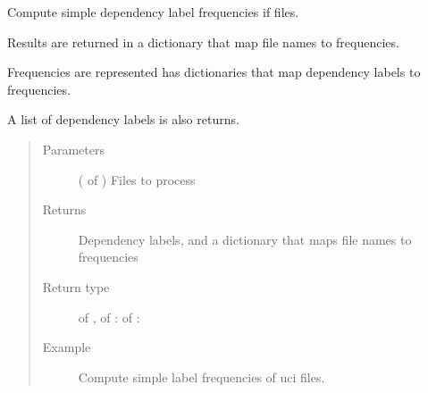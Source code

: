 \documentclass[letterpaper,10pt,english]{sphinxmanual}
\begin{document}

\begin{fulllineitems}
\label{\detokenize{analysis:loacore.analysis.frequencies.label_frequencies}}
Compute simple dependency label frequencies if files.

Results are returned in a dictionary that map file names to frequencies.

Frequencies are represented has dictionaries that map dependency labels to frequencies.

A list of dependency labels is also returns.
\begin{quote}\begin{description}
\item[{Parameters}] \leavevmode
{} ( of ) \textendash{} Files to process

\item[{Returns}] \leavevmode
Dependency labels, and a dictionary that maps file names to frequencies

\item[{Return type}] \leavevmode
{} of  ,  of  :  of  : 

\item[{Example}] \leavevmode
Compute simple label frequencies of uci files.

\end{description}\end{quote}

\end{fulllineitems}

\end{document}
